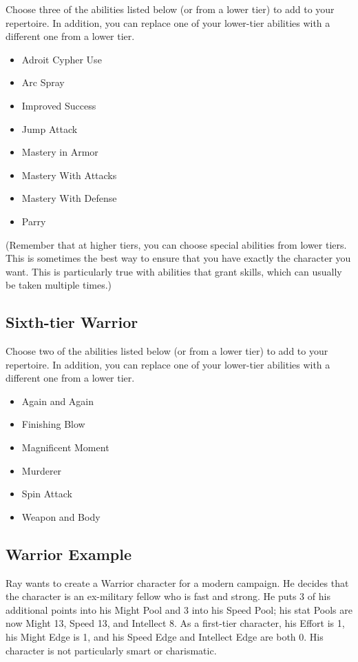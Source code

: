 Choose three of the abilities listed below (or from a lower tier) to add to your repertoire. In addition, you can replace one of your lower-tier abilities with a different one from a lower tier.

\begin{itemize}
\item Adroit Cypher Use
\item Arc Spray
\item Improved Success
\item Jump Attack
\item Mastery in Armor
\item Mastery With Attacks
\item Mastery With Defense
\item Parry
\end{itemize}

(Remember that at higher tiers, you can choose special abilities from lower tiers. This is sometimes the best way to ensure that you have exactly the character you want. This is particularly true with abilities that grant skills, which can usually be taken multiple times.)

\subsection{Sixth-tier Warrior}

Choose two of the abilities listed below (or from a lower tier) to add to your repertoire. In addition, you can replace one of your lower-tier abilities with a different one from a lower tier.

\begin{itemize}
\item Again and Again
\item Finishing Blow
\item Magnificent Moment
\item Murderer
\item Spin Attack
\item Weapon and Body
\end{itemize}

\subsection{Warrior Example}

Ray wants to create a Warrior character for a modern campaign. He decides that the character is an ex-military fellow who is fast and strong. He puts 3 of his additional points into his Might Pool and 3 into his Speed Pool; his stat Pools are now Might 13, Speed 13, and Intellect 8. As a first-tier character, his Effort is 1, his Might Edge is 1, and his Speed Edge and Intellect Edge are both 0. His character is not particularly smart or charismatic.

